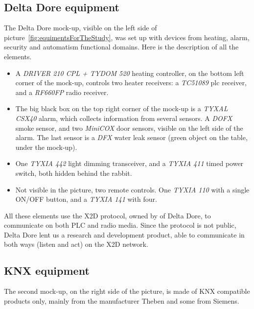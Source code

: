 \subsection{Delta Dore equipment}

The Delta Dore mock-up, visible on the left side of picture~\ref{fig:equimentsForTheStudy}, was set up with devices from heating, alarm, security and automatism functional domains. Here is the description of all the elements.\\
\begin{itemize}
\item A {\it DRIVER 210 CPL + TYDOM 520} heating controller, on the bottom left corner of the mock-up, controls two heater receivers: a {\it TC51089} \gls{plc} receiver, and a {\it RF660FP} radio receiver.
\item The big black box on the top right corner of the mock-up is a {\it TYXAL CSX40} alarm, which collects information from several sensors. A {\it DOFX} smoke sensor, and two {\it MiniCOX} door sensors, visible on the left side of the alarm. The last sensor is a {\it DFX} water leak sensor (green object on the table, under the mock-up).
\item One {\it TYXIA 442} light dimming transceiver, and a {\it TYXIA 411} timed power switch, both hidden behind the rabbit.
\item Not visible in the picture, two remote controls. One {\it TYXIA 110} with a single ON/OFF button, and a {\it TYXIA 141} with four.\\

\end{itemize}

All these elements use the X2D protocol, owned by of Delta Dore, to communicate on both PLC and radio media. Since the protocol is not public, Delta Dore lent us a research and development product, able to communicate in both ways (listen and act) on the X2D network.\\

\subsection{KNX equipment}

The second mock-up, on the right side of the picture, is made of KNX compatible products only, mainly from the manufacturer Theben and some from Siemens.\\

